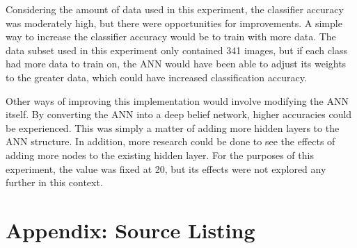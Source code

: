 \documentclass{article}
\begin{document}
Considering the amount of data used in this experiment, the classifier accuracy was moderately high, but there were opportunities for improvements. A simple way to increase the classifier accuracy would be to train with more data. The data subset used in this experiment only contained 341 images, but if each class had more data to train on, the ANN would have been able to adjust its weights to the greater data, which could have increased classification accuracy.

Other ways of improving this implementation would involve modifying the ANN itself. By converting the ANN into a deep belief network, higher accuracies could be experienced. This was simply a matter of adding more hidden layers to the ANN structure. In addition, more research could be done to see the effects of adding more nodes to the existing hidden layer. For the purposes of this experiment, the value was fixed at 20, but its effects were not explored any further in this context.

\newpage



\newpage
\onecolumn
\appendix
\section{Appendix: Source Listing}
\label{sec:source}







\end{document}
